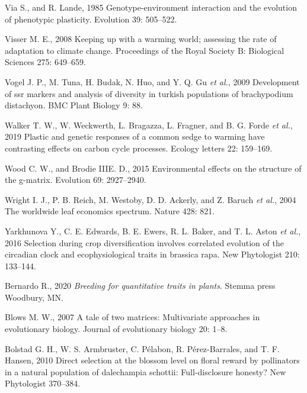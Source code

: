 \documentclass[jou,floatsintext]{apa6}
\begin{document}
\leavevmode\hypertarget{ref-via1985genotype}{}%
Via S., and R. Lande, 1985 Genotype-environment interaction and the evolution of phenotypic plasticity. Evolution 39: 505--522.

\leavevmode\hypertarget{ref-visser2008keeping}{}%
Visser M. E., 2008 Keeping up with a warming world; assessing the rate of adaptation to climate change. Proceedings of the Royal Society B: Biological Sciences 275: 649--659.

\leavevmode\hypertarget{ref-vogel2009development}{}%
Vogel J. P., M. Tuna, H. Budak, N. Huo, and Y. Q. Gu \emph{et al.}, 2009 Development of ssr markers and analysis of diversity in turkish populations of brachypodium distachyon. BMC Plant Biology 9: 88.

\leavevmode\hypertarget{ref-walker2019plastic}{}%
Walker T. W., W. Weckwerth, L. Bragazza, L. Fragner, and B. G. Forde \emph{et al.}, 2019 Plastic and genetic responses of a common sedge to warming have contrasting effects on carbon cycle processes. Ecology letters 22: 159--169.

\leavevmode\hypertarget{ref-wood2015environmental}{}%
Wood C. W., and Brodie IIIE. D., 2015 Environmental effects on the structure of the g-matrix. Evolution 69: 2927--2940.

\leavevmode\hypertarget{ref-wright2004worldwide}{}%
Wright I. J., P. B. Reich, M. Westoby, D. D. Ackerly, and Z. Baruch \emph{et al.}, 2004 The worldwide leaf economics spectrum. Nature 428: 821.

\leavevmode\hypertarget{ref-yarkhunova2016selection}{}%
Yarkhunova Y., C. E. Edwards, B. E. Ewers, R. L. Baker, and T. L. Aston \emph{et al.}, 2016 Selection during crop diversification involves correlated evolution of the circadian clock and ecophysiological traits in brassica rapa. New Phytologist 210: 133--144.

\leavevmode\hypertarget{ref-bernardo2020breeding}{}%
Bernardo R., 2020 \emph{Breeding for quantitative traits in plants}. Stemma press Woodbury, MN.

\leavevmode\hypertarget{ref-blows2007tale}{}%
Blows M. W., 2007 A tale of two matrices: Multivariate approaches in evolutionary biology. Journal of evolutionary biology 20: 1--8.

\leavevmode\hypertarget{ref-bolstad2010direct}{}%
Bolstad G. H., W. S. Armbruster, C. Pélabon, R. Pérez-Barrales, and T. F. Hansen, 2010 Direct selection at the blossom level on floral reward by pollinators in a natural population of dalechampia schottii: Full-disclosure honesty? New Phytologist 370--384.
\end{document}
